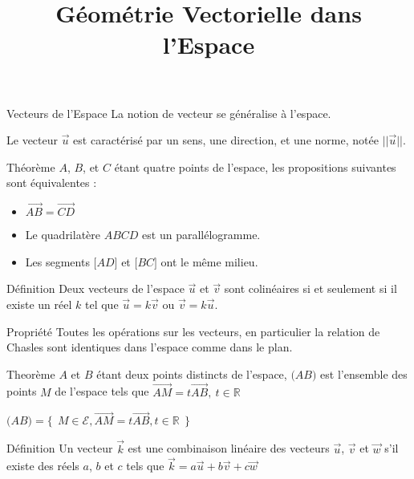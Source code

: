 \documentclass{cours}
\title{Géométrie Vectorielle dans l'Espace}
\begin{document}

    \begin{Gpartie}{Vecteurs de l'Espace} 
        La notion de vecteur se généralise à l'espace.

        Le vecteur $\vec{u}$ est caractérisé par un sens, une direction, et une norme, notée $\lvert\lvert{\vec{u}}\rvert\rvert$.
        \begin{Spartie}{Théorème} 
            $A$, $B$, et $C$ étant quatre points de l'espace, les propositions suivantes sont équivalentes :
            \begin{itemize}
                \item $\overrightarrow{AB}=\overrightarrow{CD}$
                \item Le quadrilatère $ABCD$ est un parallélogramme.
                \item Les segments $\big[AD\big]$ et $\big[BC\big]$ ont le même milieu.
            \end{itemize}
        \end{Spartie}
        \begin{Spartie}{Définition} 
            Deux vecteurs de l'espace $\vec{u}$ et $\vec{v}$ sont colinéaires si et seulement si il existe un réel $k$ tel que $\vec{u}=k\vec{v}$ ou $\vec{v}=k\vec{u}$.
        \end{Spartie}
        \begin{Spartie}{Propriété} 
            Toutes les opérations sur les vecteurs, en particulier la relation de Chasles sont identiques dans l'espace comme dans le plan.
        \end{Spartie}
        \begin{Spartie}{Theorème} 
            $A$ et $B$ étant deux points distincts de l'espace, $\big(AB\big)$ est l'ensemble des points $M$ de l'espace tels que $\overrightarrow{AM}=t \overrightarrow{AB},\ t\in\mathbb{R}$

            $\big(AB\big)=\big\{\ \ M\in\mathcal{E},\overrightarrow{AM}=t \overrightarrow{AB},t\in\mathbb{R}\ \ \big\}$
        \end{Spartie}
        \begin{Spartie}{Définition} 
            Un vecteur $\vec{k}$ est une combinaison linéaire des vecteurs $\vec{u}$, $\vec{v}$ et $\vec{w}$ s'il existe des réels $a$, $b$ et $c$ tels que $\vec{k}=a\vec{u}+b\vec{v}+c\vec{w}$
        \end{Spartie}
    \end{Gpartie}
\end{document}
